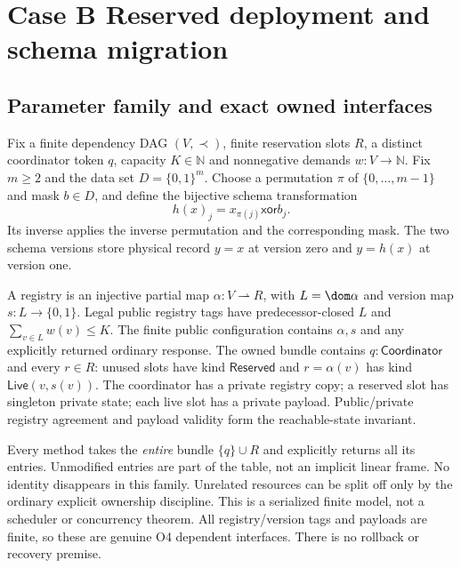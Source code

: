 \section{Case B Reserved deployment and schema migration}\label{sec:caseB}

\subsection{Parameter family and exact owned interfaces}
Fix a finite dependency DAG $(V,\prec)$, finite reservation slots $R$,
a distinct coordinator token $q$, capacity $K\in\mathbb N$ and
nonnegative demands $w:V\to\mathbb N$. Fix $m\geq2$ and the data set
$D=\{0,1\}^m$. Choose a permutation $\pi$ of $\{0,\ldots,m-1\}$ and
mask $b\in D$, and define the bijective schema transformation
\[
h(x)_j=x_{\pi(j)}\mathbin{\mathsf{xor}}b_j.
\]
Its inverse applies the inverse permutation and the corresponding mask.
The two schema versions store physical record $y=x$ at version zero
and $y=h(x)$ at version one.

A registry is an injective partial map $\alpha:V\rightharpoonup R$,
with $L=\dom\alpha$ and version map $s:L\to\{0,1\}$. Legal public
registry tags have predecessor-closed $L$ and
$\sum_{v\in L}w(v)\leq K$. The finite public configuration contains
$\alpha,s$ and any explicitly returned ordinary response. The owned
bundle contains $q:\mathsf{Coordinator}$ and every $r\in R$:
unused slots have kind $\mathsf{Reserved}$ and $r=\alpha(v)$ has kind
$\mathsf{Live}(v,s(v))$. The coordinator has a private registry copy;
a reserved slot has singleton private state; each live slot has a private
payload. Public/private registry agreement and payload validity form the
reachable-state invariant.

Every method takes the \emph{entire} bundle $\{q\}\cup R$ and explicitly
returns all its entries. Unmodified entries are part of the table, not
an implicit linear frame. No identity disappears in this family.
Unrelated resources can be split off only by the ordinary explicit
ownership discipline. This is a serialized finite model, not a scheduler
or concurrency theorem. All registry/version tags and payloads are finite,
so these are genuine O4 dependent interfaces. There is no rollback or
recovery premise.


